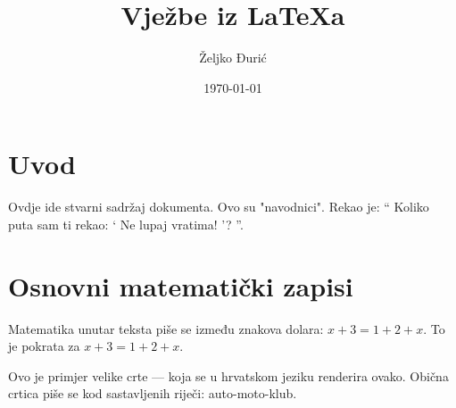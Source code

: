 \documentclass[12pt]{scrartcl}
\begin{document}
    \title{Vježbe iz \LaTeX a}
    \author{Željko Đurić}
    \date{\today}
    \maketitle
    \section{Uvod}
        Ovdje ide stvarni sadržaj dokumenta.
        Ovo su "navodnici".
        Rekao je:
        \enquote {
            Koliko puta sam ti rekao:
                \enquote {
                    Ne lupaj vratima!
                }?
        }.
    \section{Osnovni matematički zapisi}
        Matematika unutar teksta piše se između znakova dolara: $x + 3 = 1 + 2 + x$. 
        To je pokrata za \(x + 3 = 1 + 2 + x\). %

        Ovo je primjer velike crte --- koja se u hrvatskom jeziku renderira ovako.
        Obična crtica piše se kod sastavljenih riječi: auto-moto-klub.
\end{document}
